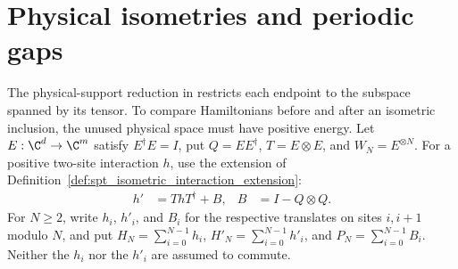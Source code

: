 
\section{Physical isometries and periodic gaps}
\label{sec:mpo_isometric_gap_transport}

The physical-support reduction in
\cite[Section~5]{GarreRubio2023MPOSym} restricts each endpoint to the
subspace spanned by its tensor. To compare Hamiltonians before and after
an isometric inclusion, the unused physical space must have positive
energy. Let $E:\C^d\to\C^m$ satisfy $E^\dagger E=I$, put
$Q=EE^\dagger$, $T=E\otimes E$, and $W_N=E^{\otimes N}$.
For a positive two-site interaction $h$, use the extension of
Definition~\ref{def:spt_isometric_interaction_extension}:
\begin{align}
    h' & =ThT^\dagger+B, & B & =I-Q\otimes Q.
    \label{eq:mpo_isometry_extension}
\end{align}
For $N\geq2$, write $h_i$, $h'_i$, and $B_i$ for the respective
translates on sites $i,i+1$ modulo $N$, and put
$H_N=\sum_{i=0}^{N-1}h_i$, $H'_N=\sum_{i=0}^{N-1}h'_i$, and
$P_N=\sum_{i=0}^{N-1}B_i$. Neither the $h_i$ nor the $h'_i$ are
assumed to commute.

